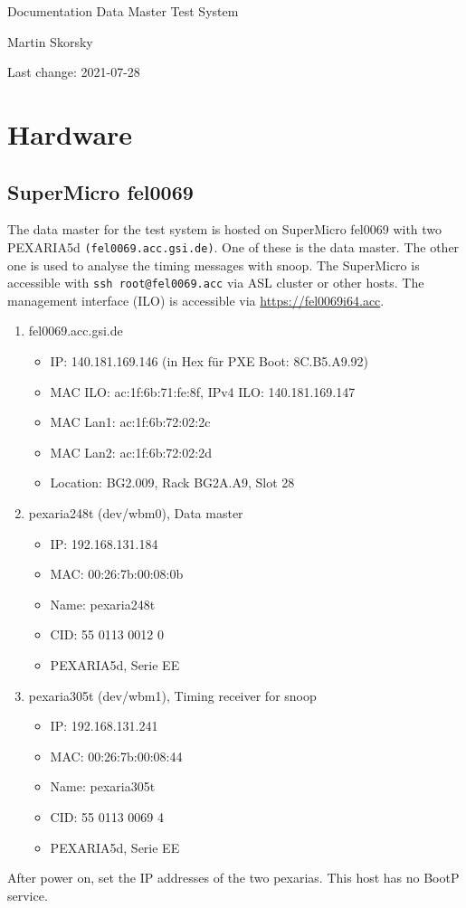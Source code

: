 \documentclass[12pt,a4paper]{report}
\begin{document}
\begin{titlepage}
\vspace{2cm}
\begin{center}
\Huge{Documentation Data Master Test System}

\Large{Martin Skorsky}

\Large{Last change: 2021-07-28}
\end{center}
\vfill
\end{titlepage}

\tableofcontents

\chapter{Hardware}
\section{SuperMicro fel0069}
The data master for the test system is hosted on SuperMicro fel0069 with two PEXARIA5d \texttt{(fel0069.acc.gsi.de)}.
One of these is the data master. The other one is used to analyse the timing messages with snoop.
The SuperMicro is accessible with \texttt{ssh root@fel0069.acc} via ASL cluster or other hosts.
The management interface (ILO) is accessible via \url{https://fel0069i64.acc}.
\begin{enumerate}
\item fel0069.acc.gsi.de
\begin{itemize}
\item IP: 140.181.169.146 (in Hex für PXE Boot: 8C.B5.A9.92)
\item MAC ILO: ac:1f:6b:71:fe:8f, IPv4 ILO: 140.181.169.147
\item MAC Lan1: ac:1f:6b:72:02:2c
\item MAC Lan2: ac:1f:6b:72:02:2d
\item Location: BG2.009, Rack BG2A.A9, Slot 28
\end{itemize}
\item pexaria248t (dev/wbm0), Data master
\begin{itemize}
\item IP: 192.168.131.184
\item MAC: 00:26:7b:00:08:0b
\item Name: pexaria248t
\item CID: 55 0113 0012 0
\item PEXARIA5d, Serie EE
\end{itemize}
\item pexaria305t (dev/wbm1), Timing receiver for snoop
\begin{itemize}
\item IP: 192.168.131.241
\item MAC: 00:26:7b:00:08:44
\item Name: pexaria305t
\item CID: 55 0113 0069 4
\item PEXARIA5d, Serie EE
\end{itemize}
\end{enumerate}
After power on, set the IP addresses of the two pexarias. This host has no BootP service.
\end{document}
